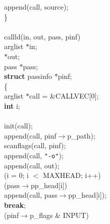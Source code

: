 \begin{flushleft}
\hspace*{6\indentation}append(call, source);\mbox{}\\
\}\mbox{}\\
\mbox{}\\
callld(in, out, pass, pinf)\mbox{}\\
\hspace*{3\indentation}{\bf struct} arglist $\ast$in;\mbox{}\\
\hspace*{3\indentation}{\bf char} $\ast$out;\mbox{}\\
\hspace*{3\indentation}{\bf struct} pass $\ast$pass;\mbox{}\\
\hspace*{3\indentation}{\bf register} {\bf struct} passinfo $\ast$pinf;\mbox{}\\
\{\mbox{}\\
\hspace*{3\indentation}{\bf struct} arglist $\ast$call = \&CALLVEC[0];\mbox{}\\
\hspace*{3\indentation}{\bf register} {\bf int} i;\mbox{}\\
\mbox{}\\
\hspace*{3\indentation}init(call);\mbox{}\\
\hspace*{3\indentation}append(call, pinf$\rightarrow$p\_path);\mbox{}\\
\hspace*{3\indentation}scanflags(call, pinf);\mbox{}\\
\hspace*{3\indentation}append(call, {\tt"-o"});\mbox{}\\
\hspace*{3\indentation}append(call, out);\mbox{}\\
\hspace*{3\indentation}{\bf for} (i = 0; i $<$ MAXHEAD; i++)\mbox{}\\
\hspace*{6\indentation}{\bf if} (pass$\rightarrow$pp\_head[i])\mbox{}\\
\hspace*{9\indentation}append(call, pass$\rightarrow$pp\_head[i]);\mbox{}\\
\hspace*{6\indentation}{\bf else}  {\bf break};\mbox{}\\
\hspace*{3\indentation}{\bf if} (pinf$\rightarrow$p\_flags \& INPUT)\mbox{}\\

\end{flushleft}
